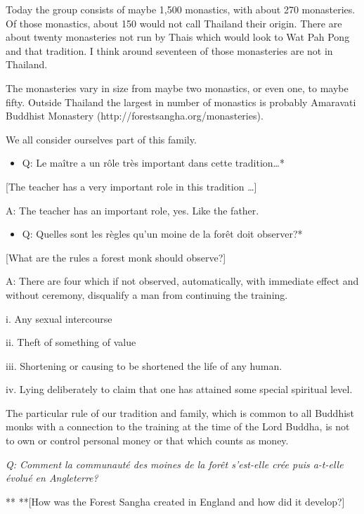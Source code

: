 Today the group consists of maybe 1,500 monastics, with about 270
monasteries. Of those monastics, about 150 would not call Thailand their
origin. There are about twenty monasteries not run by Thais which would
look to Wat Pah Pong and that tradition. I think around seventeen of
those monasteries are not in Thailand. 

The monasteries vary in size from maybe two monastics, or even one, to
maybe fifty. Outside Thailand the largest in number of monastics is
probably Amaravati Buddhist Monastery
(http://forestsangha.org/monasteries).

We all consider ourselves part of this family. 

\begin{itemize}
\item
  Q: Le maître a un rôle très important dans cette tradition\ldots{}*
\end{itemize}

{[}The teacher has a very important role in this tradition \ldots{}{]}

A: The teacher has an important role, yes. Like the father. 

\begin{itemize}
\item
  Q: Quelles sont les règles qu'un moine de la forêt doit observer?*
\end{itemize}

{[}What are the rules a forest monk should observe?{]}

A: There are four which if not observed, automatically, with immediate
effect and without ceremony, disqualify a man from continuing the
training. 

i. Any sexual intercourse

ii. Theft of something of value

iii. Shortening or causing to be shortened the life of any human. 

iv. Lying deliberately to claim that one has attained some special
spiritual level. 

The particular rule of our tradition and family, which is common to all
Buddhist monks with a connection to the training at the time of the Lord
Buddha, is not to own or control personal money or that which counts as
money. 

\emph{Q: Comment la communauté des moines de la forêt s'est-elle crée
puis a-t-elle évolué en Angleterre?}

** **{[}How was the Forest Sangha created in England and how did it
develop?{]}

